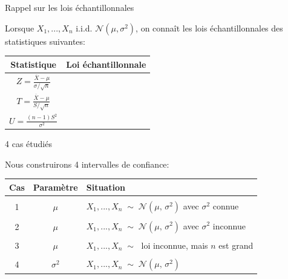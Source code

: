\documentclass{BeamerTemplate}
\begin{document}
\begin{frame}{Rappel sur les lois échantillonnales}

 Lorsque $X_1, ..., X_n$ i.i.d. $\mathcal{N}(\mu, \sigma^2)$, on connaît les lois échantillonnales des statistiques suivantes:

\begin{center}
{\renewcommand{\arraystretch}{2.5}
\begin{tabular}{|c|l|}
\hline Statistique & Loi échantillonnale %
\\[-0.15cm]
\hline \hline
$\displaystyle Z=\frac{\overline X -\mu }{\sigma/\sqrt{n}}$ & \\\hline
$\displaystyle T=\frac{\overline X -\mu }{S/\sqrt{n}}$ &\\\hline
$\displaystyle U=\frac{(n-1)S^2 }{\sigma^2}$ &\\\hline
\end{tabular}
}
\end{center}

 \vspace{1cm}

\end{frame}
\begin{frame}[t]{4 cas étudiés}

Nous construirons 4 intervalles de confiance:
\vspace{0.5cm}

\begin{tabular}{|c|c|l|}
  \hline
  Cas&Paramètre & Situation \\\hline
&&\\[-0.3cm]
1&  $\mu$ & $X_1, ..., X_n\;\sim\;\mathcal{N}(\mu, \, \sigma^2)$ avec $\sigma^2$ connue \\
&&\\
2&  $\mu$ & $X_1, ..., X_n\;\sim\;\mathcal{N}(\mu, \, \sigma^2)$ avec $\sigma^2$ inconnue  \\
&&\\
3&  $\mu$ & $X_1, ..., X_n\;\sim\;$ loi inconnue, mais $n$ est grand  \\[0.2cm]\hline
&&\\[-0.3cm]
4&  $\sigma^2$ & $X_1, ..., X_n\;\sim\;\mathcal{N}(\mu, \, \sigma^2)$ \\[0.2cm]\hline
\end{tabular}
\end{frame}
\end{document}
